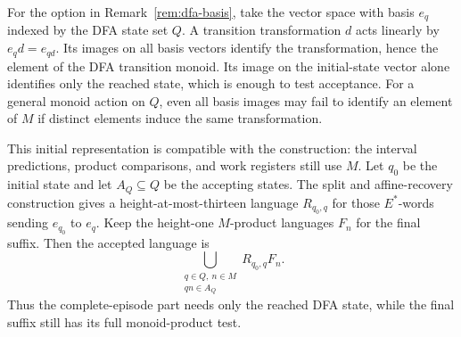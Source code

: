 \begin{remark}
For the option in Remark~\ref{rem:dfa-basis}, take the vector space with
basis $e_q$ indexed by the DFA state set $Q$. A transition transformation
$d$ acts linearly by $e_qd=e_{qd}$. Its images on all basis vectors
identify the transformation, hence the element of the DFA transition
monoid. Its image on the initial-state vector alone identifies only the
reached state, which is enough to test acceptance. For a general monoid
action on $Q$, even all basis images may fail to identify an element of
$M$ if distinct elements induce the same transformation.

This initial representation is compatible with the construction: the
interval predictions, product comparisons, and work registers still use
$M$. Let $q_0$ be the initial state and let $A_Q\subseteq Q$ be the
accepting states. The split and affine-recovery construction gives a
height-at-most-thirteen language $R_{q_0,q}$ for those $E^*$-words sending
$e_{q_0}$ to $e_q$. Keep the height-one $M$-product languages $F_n$ for
the final suffix. Then the accepted language is
\[
                  \bigcup_{\substack{q\in Q,\ n\in M\\q n\in A_Q}}
                         R_{q_0,q}F_n.
\]
Thus the complete-episode part needs only the reached DFA state, while
the final suffix still has its full monoid-product test.
\end{remark}
